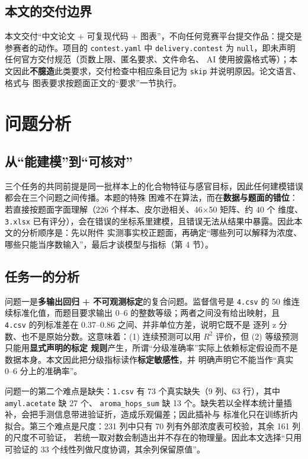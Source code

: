 \documentclass[
  a4paper,12pt]{article}
\begin{document}
\subsection{本文的交付边界}\label{ux672cux6587ux7684ux4ea4ux4ed8ux8fb9ux754c}

本文交付``中文论文 + 可复现代码 +
图表''，不向任何竞赛平台提交作品：提交是参赛者的动作。项目的
\texttt{contest.yaml} 中 \texttt{delivery.contest} 为
\texttt{null}，即未声明任何官方交付规范（页数上限、匿名要求、文件命名、
AI
使用披露格式等）；本文因此\textbf{不臆造}此类要求，交付检查中相应条目记为
\texttt{skip} 并说明原因。论文语言、格式与
图表要求按题面正文的``要求''一节执行。

\section{问题分析}\label{ux95eeux9898ux5206ux6790}

\subsection{从``能建模''到``可核对''}\label{ux4eceux80fdux5efaux6a21ux5230ux53efux6838ux5bf9}

三个任务的共同前提是同一批样本上的化合物特征与感官目标，因此任何建模错误都会在三个问题之间传播。本题的特殊
困难不在算法，而在\textbf{数据与题面的错位}：若直接按题面字面理解（226
个样本、皮尔逊相关、46×50 矩阵、约 40 个 维度、\texttt{3.xlsx}
已有评分），会在错误的坐标系里建模，且错误无法从结果中暴露。因此本文的分析顺序是：先以附件
实测事实校正题面，再确定``哪些列可以解释为浓度、哪些只能当序数输入''，最后才谈模型与指标（第
4 节）。

\subsection{任务一的分析}\label{ux4efbux52a1ux4e00ux7684ux5206ux6790}

问题一是\textbf{多输出回归 + 不可观测标定}的复合问题。监督信号是
\texttt{4.csv} 的 50 维连续标准化值，而题目要求输出 0--6
的整数等级；两者之间没有给出映射，且 \texttt{4.csv} 的列标准差在
0.37--0.86 之间、并非单位方差，说明它既不是 逐列 z
分数、也不是原始分数。这意味着：(1) 连续预测可以用 \(R^2\) 评价，但 (2)
等级预测只能用\textbf{显式声明的标定
规则}产生，所谓``分级准确率''实际上依赖标定假设而不是数据本身。本文因此把分级指标读作\textbf{标定敏感性}，并
明确声明它不能当作``真实 0--6 分上的准确率''。

问题一的第二个难点是缺失：\texttt{1.csv} 有 73 个真实缺失（9 列、63
行），其中 \texttt{amyl.acetate} 缺 27 个、 \texttt{aroma\_hops\_sum} 缺
13
个。缺失若以全样本统计量插补，会把手测信息带进验证折，造成乐观偏差；因此插补与
标准化只在训练折内拟合。第三个难点是尺度：231 列中只有 70
列有外部浓度表可校验，其余 161 列的尺度不可验证，
若统一取对数会制造出并不存在的物理量。因此本文选择``只用可验证的 33
个线性列做尺度协调，其余列保留原值''。
\end{document}
